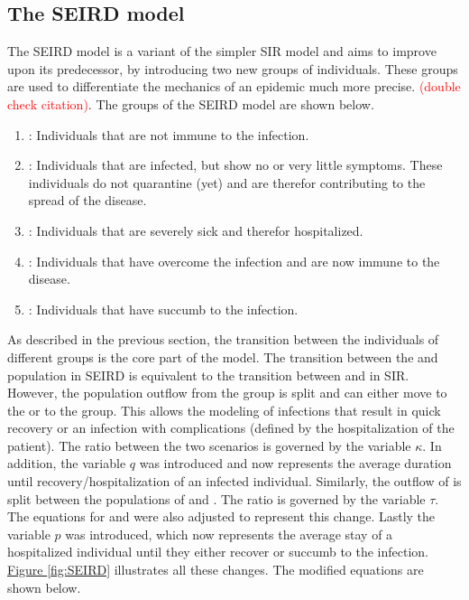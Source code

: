 \subsection{The SEIRD model}
\label{sec:SEIRD}
The SEIRD model is a variant of the simpler SIR model\cite{knodel20173d} and aims to improve upon its predecessor, by
introducing two new groups of individuals. These groups are used to differentiate the mechanics of an epidemic much
more precise.
\textcolor{red}{(double check citation)}. %
The groups of the SEIRD model are shown below.

\begin{enumerate}[label=$\bullet$]
	\item {}: Individuals that are not immune to the infection.
	\item {}: Individuals that are infected, but show no or very little symptoms. These individuals
		do not quarantine (yet) and are therefor contributing to the spread of the disease.
	\item {}: Individuals that are severely sick and therefor hospitalized.
	\item {}: Individuals that  have overcome the infection and are now immune to the disease.
	\item {}: Individuals that have succumb to the infection.
\end{enumerate}


As described in the previous section, the transition between the individuals of different groups is the core
part of the model. The transition between the  and  population in SEIRD is equivalent to the transition
between  and  in SIR. However, the population outflow from the  group is split and can either move
to the  or to the  group. This allows the modeling of infections that result in quick recovery or an infection
with complications (defined by the hospitalization of the patient). The ratio between the two scenarios is governed by the variable
$\kappa$. In addition, the variable $q$ was introduced and now represents the average duration until recovery/hospitalization of an
infected individual. Similarly, the outflow of  is split between the populations of  and . The ratio is governed
by the variable $\tau$. The equations for  and  were also adjusted to represent this change. Lastly the variable $p$ was
introduced, which now represents the average stay of a hospitalized individual until they either recover or succumb to the infection.
\hyperref[fig:SEIRD]{Figure \ref*{fig:SEIRD}} illustrates all these changes. The modified equations are shown below.

